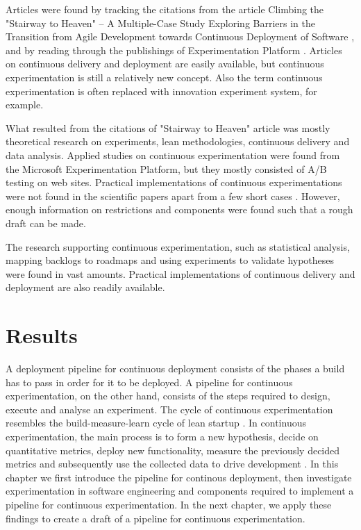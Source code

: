 \documentclass[conference]{IEEEtran}
\begin{document}
Articles were found by tracking the citations from the article Climbing the "Stairway to Heaven" -- A Multiple-Case Study Exploring Barriers in the Transition from Agile Development towards Continuous Deployment of Software \cite{olsson2012climbing}, and by reading through the publishings of Experimentation Platform \cite{ep}. Articles on continuous delivery and deployment are easily available, but continuous experimentation is still a relatively new concept. Also the term continuous experimentation is often replaced with innovation experiment system, for example.

What resulted from the citations of "Stairway to Heaven" article was mostly theoretical research on experiments, lean methodologies, continuous delivery and data analysis. Applied studies on continuous experimentation were found from the Microsoft Experimentation Platform, but they mostly consisted of A/B testing on web sites. Practical implementations of continuous experimentations were not found in the scientific papers apart from a few short cases \cite{bosch2012building}. However, enough information on restrictions and components were found such that a rough draft can be made.

The research supporting continuous experimentation, such as statistical analysis, mapping backlogs to roadmaps and using experiments to validate hypotheses were found in vast amounts. Practical implementations of continuous delivery and deployment are also readily available.

\section{Results} %

A deployment pipeline for continuous deployment consists of the phases a build has to pass in order for it to be deployed. A pipeline for continuous experimentation, on the other hand, consists of the steps required to design, execute and analyse an experiment. The cycle of continuous experimentation resembles the build-measure-learn cycle of lean startup \cite{ries2011lean}. In continuous experimentation, the main process is to form a new hypothesis, decide on quantitative metrics, deploy new functionality, measure the previously decided metrics and subsequently use the collected data to drive development \cite{bosch2012building}. In this chapter we first introduce the pipeline for continous deployment, then investigate experimentation in software engineering and components required to implement a pipeline for continuous experimentation. In the next chapter, we apply these findings to create a draft of a pipeline for continuous experimentation.
\end{document}
